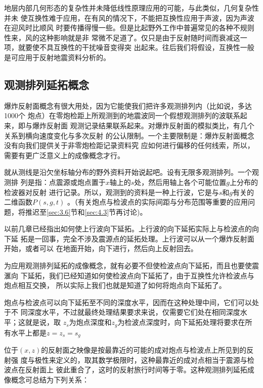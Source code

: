 地层内部几何形态的复杂性并未降低线性原理应用的可能，与此类似，几何复杂性并未
使互换性难于应用，在有风的情况下，不能把互换性应用于声波，因为声波在迎风时比顺风
时要传播得慢一些。但是比起野外工作中普遍常见的各种不规则性来，风的这种影响就是非
常微不足道了。仅只是由于反射随时间而衰减这一项，就要使不具互换性的干扰噪音变得突
出起来。往后我们将假设，互换性一般是可应用于反射地震资料分析的。

\subsection{观测排列延拓概念}
\label{sec:3.3.2}

爆炸反射面概念有很大用处，因为它能使我们把许多观测排列内（比如说，多达1000个
炮点）在零炮检距上所观测到的地震波同一个假想观测排列的波联系起来，即与爆炸反射面
观测记录结果联系起来。对爆炸反射面的模拟类比，有几个关系到横向速度变化与多次反射
的公认限制。一个主要限制是：爆炸反射面概念没有向我们提供关于非零炮检距记录资料究
应如何进行偏移的任何线索，所以，需要有更广泛意义上的成像概念才行。

就从测线是沿欠坐标轴分布的野外资料开始说起吧。设有无限多观测排列。一个观测排
列是指：点震源或炮点置于$x$轴上的$s$处，然后用轴上各个可能位置$g$上分布的检波器对反射
进行记录。所以，观测到的资料是一种上行波，它是与$s$和$g$有关的二维函数$P(s,g,t)$
。（有关炮点与检波点的实际间距与分布范围等重要的应用问题，将推迟至\ref{sec:3.6}节和\ref{sec:4.3}节再讨论)。

以前几章已经指出如何使上行波向下延拓。上行波的向下延拓实际上与检波点的向下延
拓是一回事，完全不涉及震源点的延拓处理。上行波可以从一个爆炸反射面开始，或者可以
在地面开始，向下进行，然后向上反射回去。

为应用观测排列延拓的成像概念，就有必要不但使检波点向下延拓，而且也要使震滙向
下延拓，我们已经知道如何使检波点向下延拓了，由于互换性允许检波点与炮点相互交换，
所以实际上我们也就是知道了如何将炮点向下延拓了。

炮点与检波点可以向下延拓至不同的深度水平，因而在这种处理中间，它们可以处于不
同深度水平，不过就最终处理结果要求来说，仅需要它们处在相同深度水平；这就是说，取
$z_s$为炮点深度和$z_g$为检波点深度时，向下延拓处理将要求在所有水平上都是$z=z_s=s_g$

位于$(x,z)$的反射面之映像是按最靠近的可能的成对炮点与检波点上所见到的反射强
度与极性来定义的，取其数学极限时，这种最靠近的成对点相当于震源与检波点在反射面上
彼此重合了，这时的反射旅行时间等于零。这种观测排列延拓成像概念可总结为下列关系：
